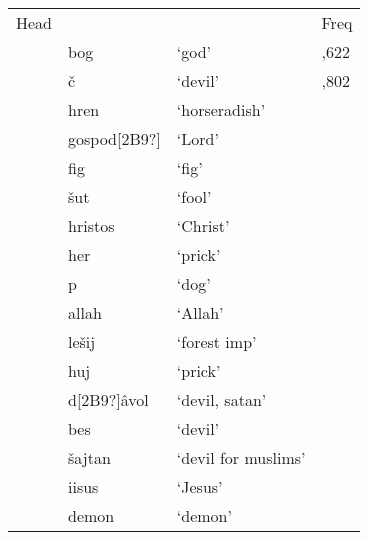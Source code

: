 \documentclass[12pt]{article}
\begin{document}
\begin{flushleft}
\tablefirsthead{}
\tablehead{}
\tabletail{}
\tablelasttail{}
\begin{supertabular}{m{0.88655984in}m{0.70805985in}m{1.9934599in}m{0.7038598in}}
{\mdseries Head} &
 &
 &
{\mdseries Freq}\\
{\mdseries {}} &
{\mdseries bog} &
{\mdseries ‘god’} &
{,622}\\
{\mdseries {}} &
{\mdseries č} &
{\mdseries ‘devil’} &
{,802}\\
{\mdseries {}} &
{\mdseries hren} &
{\mdseries ‘horseradish’} &
{}\\
{\mdseries {}} &
{\mdseries gospod[2B9?]} &
{\mdseries ‘Lord’} &
{}\\
{\mdseries {}} &
{\mdseries fig} &
{\mdseries ‘fig’} &
{}\\
{\mdseries {}} &
{\mdseries šut} &
{\mdseries ‘fool’} &
{}\\
{\mdseries {}} &
{\mdseries hristos} &
{\mdseries ‘Christ’} &
{}\\
{\mdseries {}} &
{\mdseries her} &
{\mdseries ‘prick’} &
{}\\
{\mdseries {}} &
{\mdseries p} &
{\mdseries ‘dog’} &
{}\\
{\mdseries {}} &
{\mdseries allah} &
{\mdseries ‘Allah’} &
{}\\
{\mdseries {}} &
{\mdseries lešij} &
{\mdseries ‘forest imp’} &
{}\\
{\mdseries {}} &
{\mdseries huj} &
{\mdseries ‘prick’} &
{}\\
{\mdseries {}} &
{\mdseries d[2B9?]âvol} &
{\mdseries ‘devil, satan’} &
{}\\
{\mdseries {}} &
{\mdseries bes} &
{\mdseries ‘devil’} &
{}\\
{\mdseries {}} &
{\mdseries šajtan} &
{\mdseries ‘devil for muslims’} &
{}\\
{\mdseries {}} &
{\mdseries iisus} &
{\mdseries ‘Jesus’} &
{}\\
{\mdseries {}} &
{\mdseries demon} &
{\mdseries ‘demon’} &
{}\\

\end{supertabular}
\end{flushleft}
\end{document}
